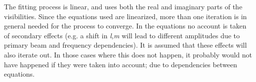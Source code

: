 	The fitting process is linear, and uses both the real and
imaginary parts of the visibilities.  Since the equations used are
linearized, more than one iteration is in general needed for the process
to converge.  In the equations no account is taken of secondary effects
(e.g.  a shift in {\em l,m} will lead to different amplitudes due to
primary beam and frequency dependencies).  It is assumed that these
effects will also iterate out.  In those cases where this does not
happen, it probably would not have happened if they were taken into
account; due to dependencies between equations. 


